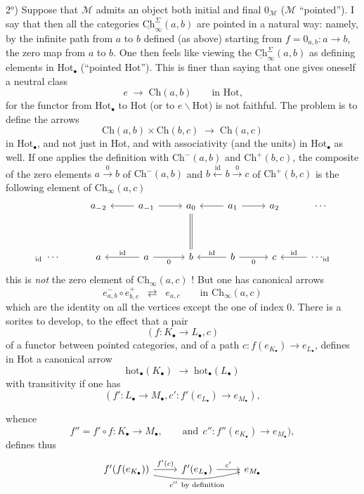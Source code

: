 \documentclass[11pt]{article}
\newcommand{\printedpage}[1]{\marginpar{\footnotesize p.~#1}}
\newcommand{\msp}[1]{\marginpar{\footnotesize [#1]}}
\newcommand{\M}{\mathcal{M}}
\newcommand{\Hot}{\mathrm{Hot}}
\newcommand{\Ch}{\mathrm{Ch}}
\newcommand{\uCh}{\underline{\mathrm{Ch}}}
\begin{document}
2$^o$) Suppose that $\M$ admits an object both initial and final $0_{\M}$ ($\M$ ``pointed''). I say that then all the categories $\uCh^{\Sigma}_{\infty}(a,b)$ are pointed in a natural way: namely, by the infinite path from $a$ to $b$ defined (as above) starting from $f = 0_{a,b} : a \longrightarrow b$, the zero map from $a$ to $b$. One then feels like viewing the $\uCh^{\Sigma}_{\infty}(a,b)$ as defining elements in $\Hot_{\bullet}$ (``pointed Hot''). This is finer than saying that one gives oneself a neutral class
\[
e \;\longrightarrow\; \Ch(a,b) \qquad \text{in Hot,}
\]
for the functor from $\Hot_{\bullet}$ to Hot (or to $e\backslash\Hot$) is not faithful. The problem is to define the arrows
\[
\Ch(a,b)\times\Ch(b,c) \;\longrightarrow\; \Ch(a,c)
\]
in $\Hot_{\bullet}$, and not just in Hot, and with associativity (and the units) in $\Hot_{\bullet}$ as well. If one applies the definition with $\Ch^{-}(a,b)$ and $\Ch^{+}(b,c)$, the composite of the zero elements $a \xrightarrow{\ 0\ } b$ of $\Ch^{-}(a,b)$ and $b \xleftarrow{\ \mathrm{id}\ } b \xrightarrow{\ 0\ } c$ of $\Ch^{+}(b,c)$
\printedpage{10}
\msp{page 16}
is the following element of $\Ch_{\infty}(a,c)$
\[
\begin{tikzcd}[row sep=huge]
 & a_{-2} & a_{-1} \arrow[l] \arrow[r] & a_{0} \arrow[d, equal] & a_{1} \arrow[l] \arrow[r] & a_{2} & \cdots \\
{}_{\mathrm{id}}\ \cdots & a & a \arrow[l, "\mathrm{id}"'] \arrow[r, "0"'] & b & b \arrow[l, "\mathrm{id}"'] \arrow[r, "0"'] & c & \cdots_{\mathrm{id}} \arrow[l, "\mathrm{id}"']
\end{tikzcd}
\]
this is \textit{not} the zero element of $\Ch_{\infty}(a,c)$ ! But one has canonical arrows
\[
e^{-}_{a,b}\circ e^{+}_{b,c} \;\;\rightleftarrows\;\; e_{a,c} \qquad \text{in } \Ch_{\infty}(a,c)
\]
which are the identity on all the vertices except the one of index 0. There is a sorites to develop, to the effect that a pair
\[
(f : K_{\bullet} \longrightarrow L_{\bullet}, c)
\]
of a functor between pointed categories, and of a path $c : f(e_{K_{\bullet}}) \longrightarrow e_{L_{\bullet}}$, defines in Hot a canonical arrow
\[
\mathrm{hot}_{\bullet}(K_{\bullet}) \;\longrightarrow\; \mathrm{hot}_{\bullet}(L_{\bullet})
\]
with transitivity if one has
\[
(f' : L_{\bullet} \longrightarrow M_{\bullet}, c' : f'(e_{L_{\bullet}}) \longrightarrow e_{M_{\bullet}}),
\]

\msp{page 17}

whence
\[
f'' = f'\circ f : K_{\bullet} \longrightarrow M_{\bullet}, \qquad \text{and}\ \ c'' : f''(e_{K_{\bullet}}) \longrightarrow e_{M_{\bullet}}), %
\]
defines thus
\[
\begin{tikzcd}
f'(f(e_{K_{\bullet}})) \arrow[r, "f'(c)"] \arrow[rr, bend right=12, "{c''\ \text{by definition}}"'] & f'(e_{L_{\bullet}}) \arrow[r, "c'"] & e_{M_{\bullet}}
\end{tikzcd}
\]
\end{document}
